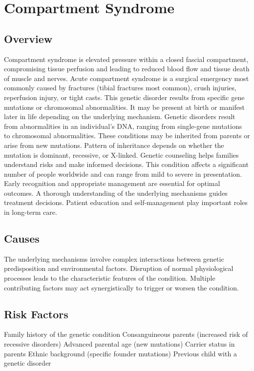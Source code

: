 \chapter{Compartment Syndrome}
\label{sec:Compartment Syndrome}

\section{Overview}
Compartment syndrome is elevated pressure within a closed fascial compartment, compromising tissue perfusion and leading to reduced blood flow and tissue death of muscle and nerves. Acute compartment syndrome is a surgical emergency most commonly caused by fractures (tibial fractures most common), crush injuries, reperfusion injury, or tight casts. This genetic disorder results from specific gene mutations or chromosomal abnormalities. It may be present at birth or manifest later in life depending on the underlying mechanism. Genetic disorders result from abnormalities in an individual's DNA, ranging from single-gene mutations to chromosomal abnormalities. These conditions may be inherited from parents or arise from new mutations. Pattern of inheritance depends on whether the mutation is dominant, recessive, or X-linked. Genetic counseling helps families understand risks and make informed decisions. This condition affects a significant number of people worldwide and can range from mild to severe in presentation. Early recognition and appropriate management are essential for optimal outcomes. A thorough understanding of the underlying mechanisms guides treatment decisions. Patient education and self-management play important roles in long-term care.
\section{Causes}
The underlying mechanisms involve complex interactions between genetic predisposition and environmental factors. Disruption of normal physiological processes leads to the characteristic features of the condition. Multiple contributing factors may act synergistically to trigger or worsen the condition.
\section{Risk Factors}
Family history of the genetic condition Consanguineous parents (increased risk of recessive disorders) Advanced parental age (new mutations) Carrier status in parents Ethnic background (specific founder mutations) Previous child with a genetic disorder

